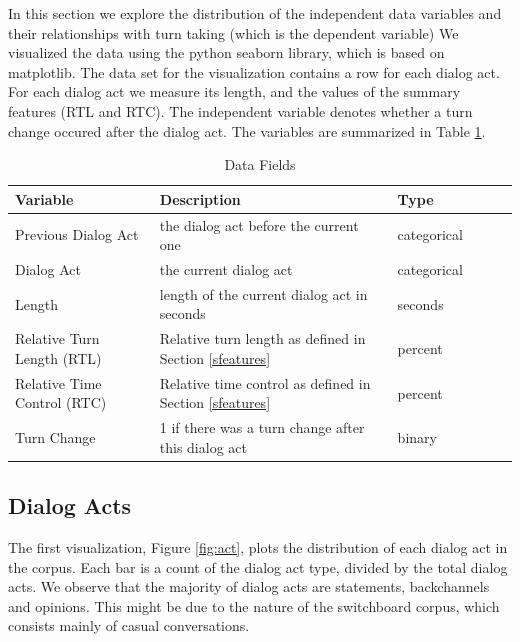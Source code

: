 In this section we explore the distribution of the independent data variables and their relationships with turn taking (which is the dependent variable)
%
We visualized the data using the python seaborn library, which is based on matplotlib. The data set for the visualization contains a row for each dialog act. For each dialog act we measure its length, and the values of the summary features (RTL and RTC). The independent variable denotes whether a turn change occured after the dialog act.  The variables are summarized in Table \ref {tab:vars}.

\begin{table}[ht!]
\begin{center}
\begin{tabular}{llllrr}
\toprule
Variable &  Description & Type &\\
\midrule
     Previous Dialog Act & the dialog act before the current one  & categorical\\
     Dialog Act & the current dialog act & categorical \\
     Length & length of the current dialog act in seconds & seconds \\
     Relative Turn Length (RTL)  & Relative turn length as defined in Section \ref{sfeatures} & percent \\
     Relative Time Control (RTC) & Relative time control as defined in Section \ref{sfeatures} & percent \\
     Turn Change & 1 if there was a turn change after this dialog act & binary \\
\bottomrule
\end{tabular}
\end{center}
\caption{Data Fields}
\label{tab:vars}
\end{table}


\subsection{Dialog Acts}

The first visualization, Figure \ref{fig:act}, plots the distribution of each dialog act in the corpus. Each bar is a count of the dialog act type, divided by the total dialog acts.  We observe that the majority of dialog acts are statements, backchannels and opinions. This might be due to the nature of the switchboard corpus, which consists mainly of casual conversations.

